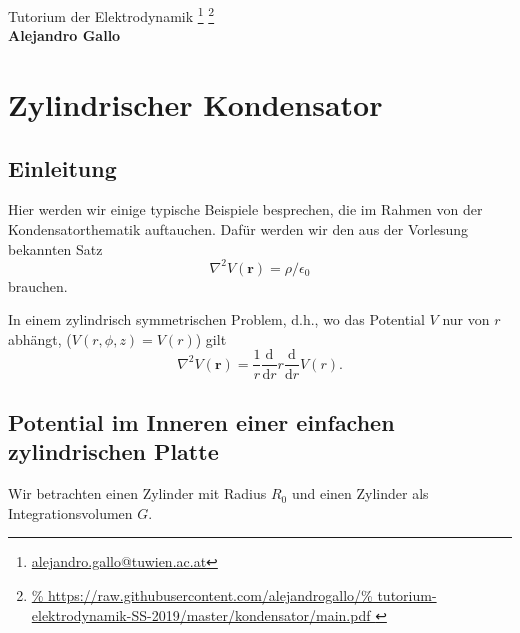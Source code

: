 \documentclass[A4paper, 12pt]{amsart}
\title{\thetitle}
\author{\me}
\date{\today}
\makeatletter
\newcommand\thetitle{Tutorium der Elektrodynamik}
\newcommand\me{Alejandro Gallo}
\newcommand\sourcefootnotes{
\footnote{\tiny \url{alejandro.gallo@tuwien.ac.at} }
\footnote{\tiny
  \url{%
    https://raw.githubusercontent.com/alejandrogallo/%
    tutorium-elektrodynamik-SS-2019/master/kondensator/main.pdf
  }
}
}
\makeatother
\begin{document}
\begin{center}
  {\Large\sc \thetitle} \sourcefootnotes\\
  {\large\bf \me}
\end{center}
\vspace{3cm}
\tableofcontents

\newpage
\section{Zylindrischer Kondensator}

\subsection{Einleitung}
Hier werden wir einige typische Beispiele
besprechen, die im Rahmen von der Kondensatorthematik
auftauchen.
Dafür werden wir den aus der Vorlesung bekannten Satz
%
\begin{equation}
  \label{eq:gauss_theorem}
  \nabla ^{2} V(\mathbf{r}) = \rho / \epsilon_{0}
\end{equation}
%
brauchen.

In einem zylindrisch symmetrischen Problem, d.h., wo das Potential
$ V $ nur von $ r $ abhängt, ($ V(r, \phi, z) = V(r) $) gilt
%
\begin{equation}
  \label{eq:laplacian_in_cylindrical_coordinates}
  \nabla ^{2} V(\mathbf{r}) =
  \frac{1}{r}
  \frac{\mathrm{d}}{\mathrm{d}r}
  r
  \frac{\mathrm{d}}{\mathrm{d}r}
  V(r)
  .
\end{equation}
%

\subsection{Potential im Inneren einer einfachen zylindrischen Platte}

Wir betrachten einen Zylinder mit Radius $ R_{0} $ und einen
Zylinder als Integrationsvolumen $ G $.

\begin{center}
  
\end{center}
\end{document}
